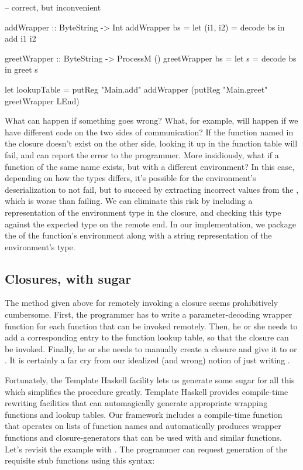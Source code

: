 \documentclass[preprint]{sigplanconf}
\begin{document}
\begin{code}
-- correct, but inconvenient

addWrapper :: ByteString -> Int
addWrapper bs = 
  let (i1, i2) = decode bs
   in add i1 i2

greetWrapper :: ByteString -> ProcessM ()
greetWrapper bs =
  let s = decode bs
   in greet s             

let lookupTable =
  putReg "Main.add" addWrapper
    (putReg "Main.greet" greetWrapper LEnd)
\end{code}

What can happen if something goes wrong? What, for example, will happen if we have different code on the two sides of communication? If the function named in the closure doesn't exist on the other side, looking it up in the function table will fail, and  can report the error to the programmer. More insidiously, what if a function of the same name exists, but with a different environment? In this case, depending on how the types differs, it's possible for the environment's deserialization to not fail, but to succeed by extracting incorrect values from the , which is worse than failing. We can eliminate this risk by including a representation of the environment type in the closure, and checking this type against the expected type on the remote end. In our implementation, we package the  of the function's environment along with a string representation of the environment's type.


\subsection{Closures, with sugar}

The method given above for remotely invoking a closure seems prohibitively cumbersome. First, the programmer has to write a parameter-decoding wrapper function for each function that can be invoked remotely. Then, he or she needs to add a corresponding entry to the function lookup table, so that the closure can be invoked. Finally, he or she needs to manually create a closure and give it to  or . It is certainly a far cry from our idealized (and wrong) notion of just writing .

Fortunately, the Template Haskell facility lets us generate some sugar for all this which simplifies the procedure greatly. Template Haskell provides compile-time rewriting facilities that can automagically generate appropriate wrapping functions and lookup tables. Our framework includes a compile-time  function that operates on lists of function names and automatically produces wrapper functions and closure-generators that can be used with  and similar functions. Let's revisit the example with . The programmer can request generation of the requisite stub functions using this syntax:
\end{document}
